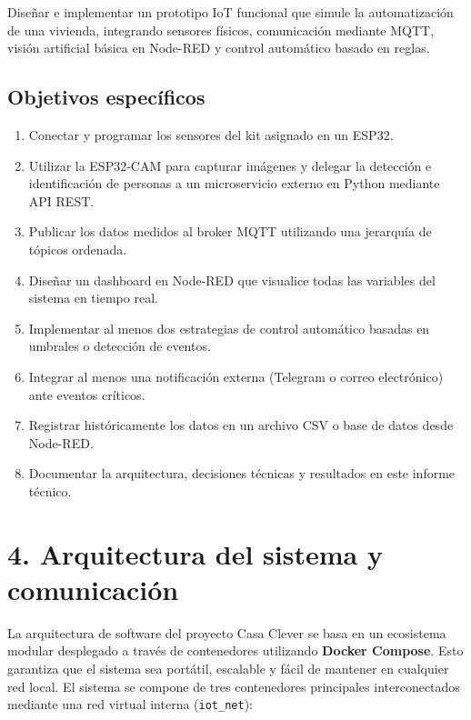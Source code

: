 \documentclass[12pt, a4paper]{report}
\begin{document}
Diseñar e implementar un prototipo IoT funcional que simule la automatización de una vivienda, integrando sensores físicos, comunicación mediante MQTT, visión artificial básica en Node-RED y control automático basado en reglas.

\section*{Objetivos específicos}

\begin{enumerate}
  \item Conectar y programar los sensores del kit asignado en un ESP32.
  \item Utilizar la ESP32-CAM para capturar imágenes y delegar la detección e identificación de personas a un microservicio externo en Python mediante API REST.
  \item Publicar los datos medidos al broker MQTT utilizando una jerarquía de tópicos ordenada.
  \item Diseñar un dashboard en Node-RED que visualice todas las variables del sistema en tiempo real.
  \item Implementar al menos dos estrategias de control automático basadas en umbrales o detección de eventos.
  \item Integrar al menos una notificación externa (Telegram o correo electrónico) ante eventos críticos.
  \item Registrar históricamente los datos en un archivo CSV o base de datos desde Node-RED.
  \item Documentar la arquitectura, decisiones técnicas y resultados en este informe técnico.
\end{enumerate}

\chapter*{4. Arquitectura del sistema y comunicación}

La arquitectura de software del proyecto Casa Clever se basa en un ecosistema modular desplegado a través de contenedores utilizando \textbf{Docker Compose}. Esto garantiza que el sistema sea portátil, escalable y fácil de mantener en cualquier red local. El sistema se compone de tres contenedores principales interconectados mediante una red virtual interna (\texttt{iot\_net}):
\end{document}
